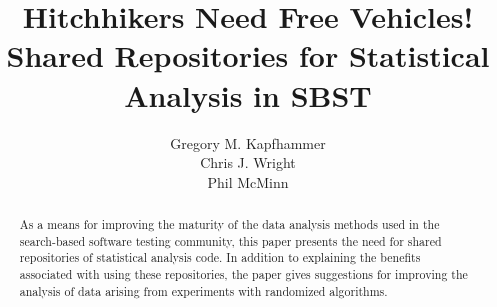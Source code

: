 \documentclass{sig-alternate}
\begin{document}


\title{Hitchhikers Need Free Vehicles! \\ Shared Repositories for Statistical Analysis in SBST \vspace*{-.05in}}


\author{
\alignauthor
Gregory M. Kapfhammer\\
\alignauthor
Chris J. Wright\\
\alignauthor
Phil McMinn\\
}

\maketitle

\begin{abstract}
  As a means for improving the maturity of the data analysis methods used in the search-based software testing
  community, this paper presents the need for shared repositories of statistical analysis code. In addition to
  explaining the benefits associated with using these repositories, the paper gives suggestions for improving the
  analysis of data arising from experiments with randomized algorithms. \vspace*{-1em}
\end{abstract}






\vspace*{-.5em}

\scriptsize


\end{document}
